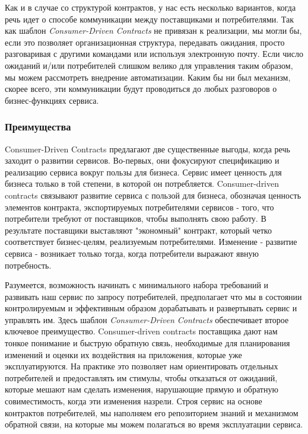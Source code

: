 \documentclass[11pt]{article}
\begin{document}
Как и в случае со структурой контрактов, у нас есть несколько вариантов,
когда речь идет о способе коммуникации между поставщиками и
потребителями. Так как шаблон \emph{Consumer-Driven Contracts} не
привязан к реализации, мы могли бы, если это позволяет организационная
структура, передавать ожидания, просто разговаривая с другими командами
или используя электронную почту. Если число ожиданий и/или потребителей
слишком велико для управления таким образом, мы можем рассмотреть
внедрение автоматизации. Каким бы ни был механизм, скорее всего, эти
коммуникации будут проводиться до любых разговоров о бизнес-функциях
сервиса.

\subsubsection{Преимущества}\label{ux43fux440ux435ux438ux43cux443ux449ux435ux441ux442ux432ux430}

Consumer-Driven Contracts предлагают две существенные выгоды, когда речь
заходит о развитии сервисов. Во-первых, они фокусируют спецификацию и
реализацию сервиса вокруг пользы для бизнеса. Сервис имеет ценность для
бизнеса только в той степени, в которой он потребляется. Consumer-driven
contracts связывают развитие сервиса с пользой для бизнеса, обозначая
ценность элементов контракта, экспортируемых потребителями сервисов -
того, что потребители требуют от поставщиков, чтобы выполнять свою
работу. В результате поставщики выставляют "экономный" контракт, который
четко соответствует бизнес-целям, реализуемым потребителями. Изменение -
развитие сервиса - возникает только тогда, когда потребители выражают
явную потребность.

Разумеется, возможность начинать с минимального набора требований и
развивать наш сервис по запросу потребителей, предполагает что мы в
состоянии контролируемым и эффективным образом дорабатывать и
развертывать сервис и управлять им. Здесь шаблон \emph{Consumer-Driven
Contracts} обеспечивает второе ключевое преимущество. Consumer-driven
contracts поставщика дают нам тонкое понимание и быструю обратную связь,
необходимые для планирования изменений и оценки их воздействия на
приложения, которые уже эксплуатируются. На практике это позволяет нам
ориентировать отдельных потребителей и предоставлять им стимулы, чтобы
отказаться от ожиданий, которые мешают нам сделать изменения, нарушающие
прямую и обратную совиместимость, когда эти изменения назрели. Строя
сервис на основе контрактов потребителей, мы наполняем его репозиторием
знаний и механизмом обратной связи, на которые мы можем полагаться во
время эксплуатации сервиса.
\end{document}
